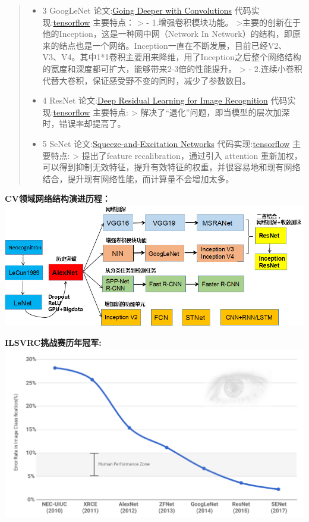 \begin{quote}
\begin{itemize}
\item
  3 GoogLeNet 论文:\href{https://arxiv.org/abs/1409.4842}{Going Deeper
  with Convolutions}
  代码实现:\href{https://github.com/tensorflow/tensorflow/blob/361a82d73a50a800510674b3aaa20e4845e56434/tensorflow/contrib/slim/python/slim/nets/inception_v1.py}{tensorflow}
  主要特点： \textgreater{} - 1.增强卷积模块功能。
  \textgreater{}主要的创新在于他的Inception，这是一种网中网（Network In
  Network）的结构，即原来的结点也是一个网络。Inception一直在不断发展，目前已经V2、V3、V4。其中1*1卷积主要用来降维，用了Inception之后整个网络结构的宽度和深度都可扩大，能够带来2-3倍的性能提升。
  \textgreater{} -
  2.连续小卷积代替大卷积，保证感受野不变的同时，减少了参数数目。
\item
  4 ResNet 论文:\href{https://arxiv.org/abs/1512.03385}{Deep Residual
  Learning for Image Recognition}
  代码实现:\href{https://github.com/tensorflow/tensorflow/blob/361a82d73a50a800510674b3aaa20e4845e56434/tensorflow/contrib/slim/python/slim/nets/inception_v1.py}{tensorflow}
  主要特点: \textgreater{}
  解决了``退化''问题，即当模型的层次加深时，错误率却提高了。
\item
  5 SeNet
  论文:\href{https://arxiv.org/abs/1709.01507}{Squeeze-and-Excitation
  Networks}
  代码实现:\href{https://github.com/ry/tensorflow-resnet}{tensorflow}
  主要特点: \textgreater{} 提出了feature recalibration，通过引入
  attention
  重新加权，可以得到抑制无效特征，提升有效特征的权重，并很容易地和现有网络结合，提升现有网络性能，而计算量不会增加太多。
\end{itemize}
\end{quote}

\textbf{CV领域网络结构演进历程：}
\includegraphics{./img/ch12/网络结构演进.png}

\textbf{ILSVRC挑战赛历年冠军:} \includegraphics{./img/ch12/历年冠军.png}

